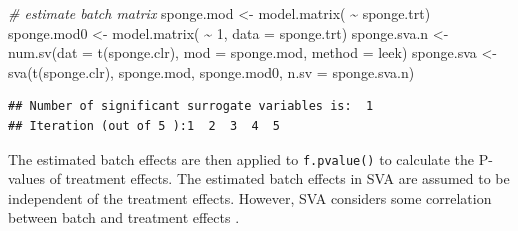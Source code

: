 \documentclass[
]{book}
\newenvironment{Shaded}{\begin{snugshade}}{\end{snugshade}}
\newcommand{\AttributeTok}[1]{\textcolor[rgb]{0.77,0.63,0.00}{#1}}
\newcommand{\CommentTok}[1]{\textcolor[rgb]{0.56,0.35,0.01}{\textit{#1}}}
\newcommand{\DecValTok}[1]{\textcolor[rgb]{0.00,0.00,0.81}{#1}}
\newcommand{\FunctionTok}[1]{\textcolor[rgb]{0.00,0.00,0.00}{#1}}
\newcommand{\NormalTok}[1]{#1}
\newcommand{\OtherTok}[1]{\textcolor[rgb]{0.56,0.35,0.01}{#1}}
\newcommand{\SpecialCharTok}[1]{\textcolor[rgb]{0.00,0.00,0.00}{#1}}
\newcommand{\StringTok}[1]{\textcolor[rgb]{0.31,0.60,0.02}{#1}}
\begin{document}
\begin{Shaded}
\begin{Highlighting}[]
\CommentTok{\# estimate batch matrix}
\NormalTok{sponge.mod }\OtherTok{\textless{}{-}} \FunctionTok{model.matrix}\NormalTok{( }\SpecialCharTok{\textasciitilde{}}\NormalTok{ sponge.trt)}
\NormalTok{sponge.mod0 }\OtherTok{\textless{}{-}} \FunctionTok{model.matrix}\NormalTok{( }\SpecialCharTok{\textasciitilde{}} \DecValTok{1}\NormalTok{, }\AttributeTok{data =}\NormalTok{ sponge.trt)}
\NormalTok{sponge.sva.n }\OtherTok{\textless{}{-}} \FunctionTok{num.sv}\NormalTok{(}\AttributeTok{dat =} \FunctionTok{t}\NormalTok{(sponge.clr), }\AttributeTok{mod =}\NormalTok{ sponge.mod, }\AttributeTok{method =} \StringTok{\textquotesingle{}leek\textquotesingle{}}\NormalTok{)}
\NormalTok{sponge.sva }\OtherTok{\textless{}{-}} \FunctionTok{sva}\NormalTok{(}\FunctionTok{t}\NormalTok{(sponge.clr), sponge.mod, sponge.mod0, }\AttributeTok{n.sv =}\NormalTok{ sponge.sva.n)}
\end{Highlighting}
\end{Shaded}

\begin{verbatim}
## Number of significant surrogate variables is:  1 
## Iteration (out of 5 ):1  2  3  4  5
\end{verbatim}

The estimated batch effects are then applied to \texttt{f.pvalue()} to calculate the P-values of treatment effects. The estimated batch effects in SVA are assumed to be independent of the treatment effects. However, SVA considers some correlation between batch and treatment effects \citep{wang2020managing}.

\begin{Shaded}
\end{Shaded}
\end{document}
